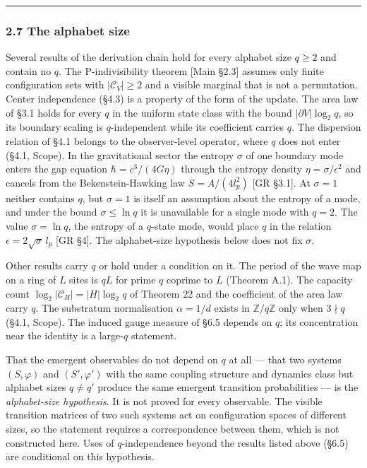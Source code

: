 \documentclass[
]{article}
\begin{document}
\begin{center}\rule{0.5\linewidth}{0.5pt}\end{center}

\hypertarget{the-alphabet-size}{%
\subsubsection{2.7 The alphabet size}\label{the-alphabet-size}}

Several results of the derivation chain hold for every alphabet size
\(q \geq 2\) and contain no \(q\). The P-indivisibility theorem {[}Main
§2.3{]} assumes only finite configuration sets with
\(|\mathcal{C}_V| \geq 2\) and a visible marginal that is not a
permutation. Center independence (§4.3) is a property of the form of the
update. The area law of §3.1 holds for every \(q\) in the uniform state
class with the bound \(|\partial V|\log_2 q\), so its boundary scaling
is \(q\)-independent while its coefficient carries \(q\). The dispersion
relation of §4.1 belongs to the observer-level operator, where \(q\)
does not enter (§4.1, Scope). In the gravitational sector the entropy
\(\sigma\) of one boundary mode enters the gap equation
\(\hbar = c^3/(4G\eta)\) through the entropy density
\(\eta = \sigma/\epsilon^2\) and cancels from the Bekenstein-Hawking law
\(S = A/(4l_p^2)\) {[}GR §3.1{]}. At \(\sigma = 1\) neither contains
\(q\), but \(\sigma = 1\) is itself an assumption about the entropy of a
mode, and under the bound \(\sigma \leq \ln q\) it is unavailable for a
single mode with \(q = 2\). The value \(\sigma = \ln q\), the entropy of
a \(q\)-state mode, would place \(q\) in the relation
\(\epsilon = 2\sqrt{\sigma}\,l_p\) {[}GR §4{]}. The alphabet-size
hypothesis below does not fix \(\sigma\).

Other results carry \(q\) or hold under a condition on it. The period of
the wave map on a ring of \(L\) sites is \(qL\) for prime \(q\) coprime
to \(L\) (Theorem A.1). The capacity count
\(\log_2|\mathcal{C}_H| = |H|\log_2 q\) of Theorem 22 and the
coefficient of the area law carry \(q\). The substratum normalisation
\(\alpha = 1/d\) exists in \(\mathbb{Z}/q\mathbb{Z}\) only when
\(3 \nmid q\) (§4.1, Scope). The induced gauge measure of §6.5 depends
on \(q\); its concentration near the identity is a large-\(q\)
statement.

That the emergent observables do not depend on \(q\) at all --- that two
systems \((S, \varphi)\) and \((S', \varphi')\) with the same coupling
structure and dynamics class but alphabet sizes \(q \neq q'\) produce
the same emergent transition probabilities --- is the
\emph{alphabet-size hypothesis}. It is not proved for every observable.
The visible transition matrices of two such systems act on configuration
spaces of different sizes, so the statement requires a correspondence
between them, which is not constructed here. Uses of \(q\)-independence
beyond the results listed above (§6.5) are conditional on this
hypothesis.
\end{document}
